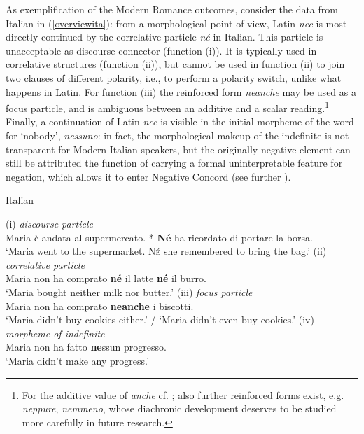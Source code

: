 \documentclass[output=paper,modfonts,nonflat,citecolor=brown,
showindex
]{langsci/langscibook}
\begin{document}
\noindent As exemplification of the Modern Romance outcomes, consider the data from Italian in (\ref{overviewita}): from a morphological point of view, Latin {\emph{nec}} is most directly continued by the correlative particle {\emph{n\'e}} in Italian. This particle is unacceptable as discourse connector (function (i)). It is typically used in correlative structures (function (ii)), but cannot be used in function (ii) to join two clauses of different polarity, i.e., to perform a polarity switch, unlike what happens in Latin. For function (iii) the reinforced form {\emph{neanche}} may be used as a focus particle, and is ambiguous between an additive and a scalar reading.{\footnote{For the additive value of {\emph{anche}} cf. \citet[]{Francoetal16b}; also further reinforced forms exist, e.g. {\emph{neppure}}, {\emph{nemmeno}}, whose diachronic development deserves to be studied more carefully in future research.}} Finally, a continuation of Latin {\emph{nec}} is visible in the initial morpheme of the word for `nobody', {\emph{nessuno}}: in fact, the morphological makeup of the indefinite is not transparent for Modern Italian speakers, but the originally negative element can still be attributed the function of carrying a formal uninterpretable feature for negation, which allows it to enter Negative Concord (see further ).

{\begin{exe}
\ex \label{overviewita} Italian
\begin{xlist}
\ex \label{polswitchfirstex} (i) {\emph{discourse particle}}\\
Maria \`e andata al supermercato. * {\textbf{N\'e}} ha ricordato di portare la borsa.\\
`Maria went to the supermarket. {\textsc{N\'e}} she remembered to bring the bag.'
\ex (ii) {\emph{correlative particle}}\\
Maria non ha comprato {\textbf{n\'e}} il latte {\textbf{n\'e}} il burro.\\
`Maria bought neither milk nor butter.'
\ex (iii) {\emph{focus particle}}\\
Maria non ha comprato {\textbf{neanche}} i biscotti.\\
`Maria didn't buy cookies either.' / `Maria didn't even buy cookies.'
\ex (iv) {\emph{morpheme of indefinite}}\\
Maria non ha fatto {\textbf{ne}}ssun progresso.\\
`Maria didn't make any progress.'
\end{xlist}
\end{exe}}
\end{document}
